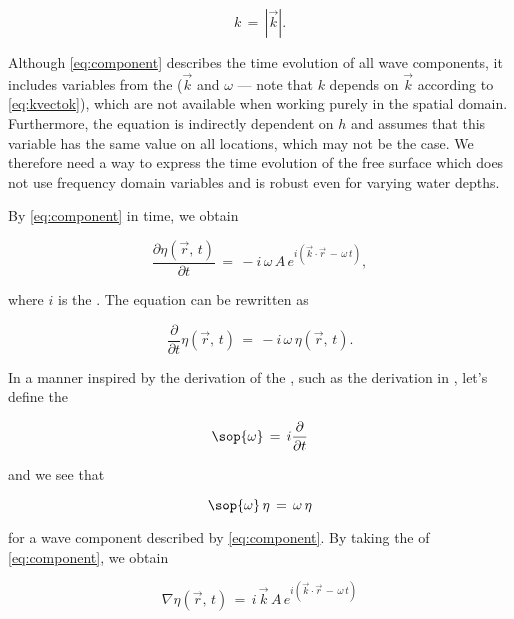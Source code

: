 \begin{equation} \label{eq:kvectok}
k \,=\, \left|\vec{k}\right|.
\end{equation}

Although \eqref{eq:component} describes the time evolution of all wave components, it includes variables from the  ($\vec{k}$ and $\omega$ --- note that $k$ depends on $\vec{k}$ according to \eqref{eq:kvectok}), which are not available when working purely in the spatial domain. Furthermore, the equation is indirectly dependent on $h$ and assumes that this variable has the same value on all locations, which may not be the case. We therefore need a way to express the time evolution of the free surface which does not use frequency domain variables and is robust even for varying water depths.

By  \eqref{eq:component} in time, we obtain

\begin{equation}
\frac{\partial\eta(\vec{r},\,t)}{\partial t} \,=\, -i\,\omega\,A\,e^{i(\vec{k}\cdot\vec{r}\,-\,\omega\,t)},
\end{equation}

where $i$ is the . The equation can be rewritten as

\begin{equation}
\frac{\partial}{\partial t}\eta(\vec{r},\,t) \,=\, -i\,\omega\,\eta(\vec{r},\,t).
\end{equation}

In a manner inspired by the derivation of the , such as the derivation in \citep{Bransden2000}, let's define the 

\begin{equation} \label{eq:opomega}
\sop{\omega} \,=\, i\frac{\partial}{\partial t}
\end{equation}

and we see that

\begin{equation} \label{eq:opomegaaction}
\sop{\omega}\,\eta \,=\, \omega\,\eta
\end{equation}

for a wave component described by \eqref{eq:component}. By taking the  of \eqref{eq:component}, we obtain

\begin{equation}
\nabla\eta(\vec{r},\,t) \,=\, i\,\vec{k}\,A\,e^{i(\vec{k}\cdot\vec{r}\,-\,\omega\,t)}
\end{equation}


